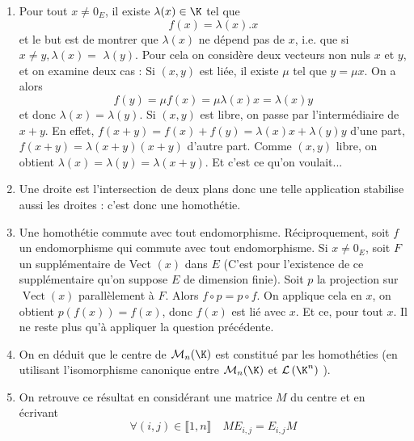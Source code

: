 \begin{enumerate}
 \item Pour tout $x \neq 0_E$, il existe $\lambda(x) \in \K$ tel que
$$
f(x)=\lambda(x) . x
$$
et le but est de montrer que $\lambda(x)$ ne dépend pas de $x$, i.e. que si $x \neq y, \lambda(x)=$ $\lambda(y)$. Pour cela on considère deux vecteurs non nuls $x$ et $y$, et on examine deux cas :
Si $(x, y)$ est liée, il existe $\mu$ tel que $y=\mu x$. On a alors
$$
f(y)=\mu f(x)=\mu \lambda(x) x=\lambda(x) y
$$
et donc $\lambda(x)=\lambda(y)$.
Si $(x, y)$ est libre, on passe par l'intermédiaire de $x+y$. En effet, $f(x+y)=f(x)+f(y)=\lambda(x) x+\lambda(y) y$ d'une part,
$f(x+y)=\lambda(x+y)(x+y)$ d'autre part.
Comme $(x, y)$ libre, on obtient $\lambda(x)=\lambda(y)=\lambda(x+y)$. Et c'est ce qu'on voulait...
\item Une droite est l'intersection de deux plans donc une telle application stabilise aussi les droites : c'est donc une homothétie.
\item Une homothétie commute avec tout endomorphisme. Réciproquement, soit $f$ un endomorphisme qui commute avec tout endomorphisme. Si $x \neq 0_E$, soit $F$ un supplémentaire de Vect $(x)$ dans $E$ (C'est pour l'existence de ce supplémentaire qu'on suppose $E$ de dimension finie). Soit $p$ la projection sur $\operatorname{Vect}(x)$ parallèlement à $F$. Alors $f \circ p=p \circ f$. On applique cela en $x$, on obtient $p(f(x))=f(x)$, donc $f(x)$ est lié avec $x$. Et ce, pour tout $x$. Il ne reste plus qu'à appliquer la question précédente.
\item On en déduit que le centre de $\mathcal{M}_n(\K)$ est constitué par les homothéties (en utilisant l'isomorphisme canonique entre $\mathcal{M}_n(\K)$ et $\mathcal{L}\left(\K^n\right)$ ).
\item On retrouve ce résultat en considérant une matrice $M$ du centre et en écrivant
$$
\forall(i, j) \in \llbracket 1, n \rrbracket \quad M E_{i, j}=E_{i, j} M
$$
\end{enumerate}
